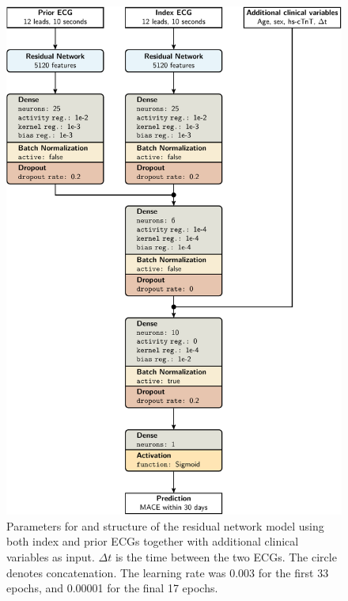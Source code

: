 \documentclass[preprint]{elsarticle}
\begin{document}
\begin{figure}[H]
\centering
\includegraphics[scale=\modelscale,keepaspectratio]{figures/model-rn4.pdf}
\caption{Parameters for and structure of the residual network model using both index and prior ECGs together with additional clinical variables as input. $\Delta t$ is the time between the two ECGs. The circle denotes concatenation. The learning rate was 0.003 for the first 33 epochs, and 0.00001 for the final 17 epochs.}
\end{figure}
\end{document}
